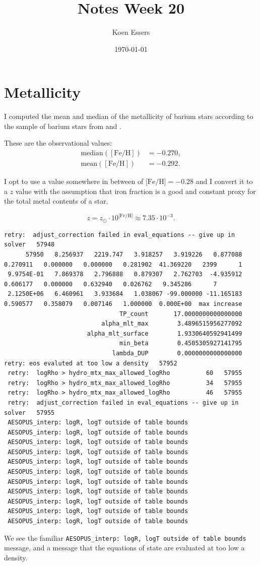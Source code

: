 \documentclass[a4paper,10pt]{article}
\title{Notes Week 20}
\author{Koen Essers}
\date{\today}
\begin{document}
\setuplayout
\section{Metallicity}

I computed the mean and median of the metallicity of barium stars according to the sample of barium stars from \citet{escorza2023} and \citet{jorissen2019}.

These are the observational values:
\begin{align*}
    \text{median}([\text{Fe/H} ]) &= -0.270,\\
    \text{mean}([\text{Fe/H} ]) &= -0.292.
\end{align*}

I opt to use a value somewhere in between of \(\text{[Fe/H]} = -0.28\) and I convert it to a \(z\) value with the assumption that iron fraction is a good and constant proxy for the total metal contents of a star.

\begin{equation*}
    z = z_\odot \cdot 10^{\text{[Fe/H]}} \approx 7.35 \cdot 10^{-3}.
\end{equation*}


\begin{verbatim}
retry:  adjust_correction failed in eval_equations -- give up in solver   57948
      57950   8.256937   2219.747   3.918257   3.919226   0.877088   0.270911   0.000000   0.000000   0.281902  41.369220   2399      1
 9.9754E-01   7.869378   2.796888   0.879307   2.762703  -4.935912   0.606177   0.000000   0.632940   0.026762   9.345286      7
 2.1250E+06   6.460961   3.933684   1.038067 -99.000000 -11.165183   0.590577   0.358079   0.007146   1.000000  0.000E+00  max increase
                                TP_count       17.0000000000000000
                           alpha_mlt_max        3.4896515956277092
                       alpha_mlt_surface        1.9330640592941499
                                min_beta        0.4505305927141795
                              lambda_DUP        0.0000000000000000
retry: eos evaluted at too low a density   57952
 retry:  logRho > hydro_mtx_max_allowed_logRho          60   57955
 retry:  logRho > hydro_mtx_max_allowed_logRho          34   57955
 retry:  logRho > hydro_mtx_max_allowed_logRho          46   57955
 retry:  adjust_correction failed in eval_equations -- give up in solver   57955
 AESOPUS_interp: logR, logT outside of table bounds
 AESOPUS_interp: logR, logT outside of table bounds
 AESOPUS_interp: logR, logT outside of table bounds
 AESOPUS_interp: logR, logT outside of table bounds
 AESOPUS_interp: logR, logT outside of table bounds
 AESOPUS_interp: logR, logT outside of table bounds
 AESOPUS_interp: logR, logT outside of table bounds
 AESOPUS_interp: logR, logT outside of table bounds
 AESOPUS_interp: logR, logT outside of table bounds
 AESOPUS_interp: logR, logT outside of table bounds
 AESOPUS_interp: logR, logT outside of table bounds
\end{verbatim}
We see the familiar \lstinline[style=output, breaklines=true]|AESOPUS_interp: logR, logT outside of table bounds| message, and a message that the equations of state are evaluated at too low a density.
\end{document}
